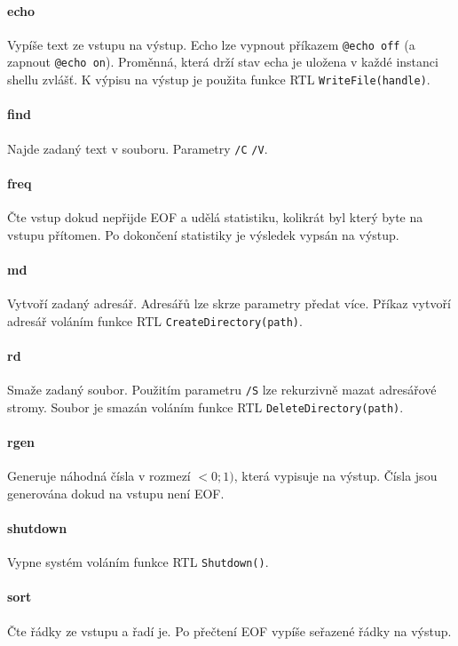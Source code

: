\documentclass[11pt,a4paper]{scrartcl}
\begin{document}
	\paragraph{echo}
	Vypíše text ze vstupu na výstup. Echo lze vypnout příkazem \verb|@echo off| (a zapnout \verb|@echo on|). Proměnná, která drží stav echa je uložena v každé instanci shellu zvlášť. K výpisu na výstup je použita funkce RTL \verb|WriteFile(handle)|.
	
	\paragraph{find}
	Najde zadaný text v souboru. Parametry \verb|/C| \verb|/V|.
	
	\paragraph{freq}
	Čte vstup dokud nepřijde EOF a udělá statistiku, kolikrát byl který byte na vstupu přítomen. Po dokončení statistiky je výsledek vypsán na výstup. 
	
	\paragraph{md}
	Vytvoří zadaný adresář. Adresářů lze skrze parametry předat více. Příkaz vytvoří adresář voláním funkce RTL \verb|CreateDirectory(path)|.
	
	\paragraph{rd}
	Smaže zadaný soubor. Použitím parametru \verb|/S| lze rekurzivně mazat adresářové stromy. Soubor je smazán voláním funkce RTL \verb|DeleteDirectory(path)|.
	
	\paragraph{rgen}
	Generuje náhodná čísla v rozmezí $<0;1)$, která vypisuje na výstup. Čísla jsou generována dokud na vstupu není EOF.
	
	\paragraph{shutdown}
	Vypne systém voláním funkce RTL \verb|Shutdown()|.
	
	\paragraph{sort}
	Čte řádky ze vstupu a řadí je. Po přečtení EOF vypíše seřazené řádky na výstup.
	
\end{document}
